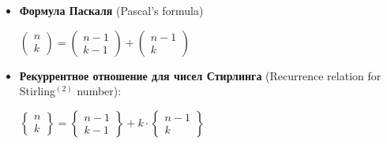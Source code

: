 \documentclass[12pt]{article}
\begin{document}
\begin{itemize}
        $\displaystyle |\Set{\text{разбиение } n \text{ элементов в } k \text{ частей}}| = \begin{Bmatrix}
                                                                                 n \\ k
        \end{Bmatrix} = S^{II}_k (n) = S(n, k)$ - число Стирлинга второго рода

        Для примера выше число Стирлинга $S(4, 2) = \begin{Bmatrix}
                                                        4 \\ 2
        \end{Bmatrix} = 7$

        Согласно Википедии \href{https://ru.wikipedia.org/wiki/%D0%A7%D0%B8%D1%81%D0%BB%D0%B0_%D0%A1%D1%82%D0%B8%D1%80%D0%BB%D0%B8%D0%BD%D0%B3%D0%B0_%D0%B2%D1%82%D0%BE%D1%80%D0%BE%D0%B3%D0%BE_%D1%80%D0%BE%D0%B4%D0%B0}{для формулы Стирлинга}
        есть формула: $\displaystyle S(n, k) = \frac{1}{k!} \sum_{j=0}^k (-1)^{k+j} \begin{pmatrix}
                                                                          k \\ j
        \end{pmatrix}j^n$

        \vspace{5mm}
        \item \textbf{Формула Паскаля} (Pascal's formula)

        $\begin{pmatrix}
             n \\ k
        \end{pmatrix} = \begin{pmatrix}
                            n - 1 \\ k - 1
        \end{pmatrix} + \begin{pmatrix}
                            n - 1 \\ k
        \end{pmatrix}$

        \vspace{5mm}
        \item \textbf{Рекуррентное отношение для чисел Стирлинга} (Recurrence relation for Stirling$\displaystyle ^{(2)}$ number):

        $\begin{Bmatrix}
             n \\ k
        \end{Bmatrix} = \begin{Bmatrix}
                            n - 1 \\ k - 1
        \end{Bmatrix} + k \cdot \begin{Bmatrix}
                                    n - 1 \\ k
        \end{Bmatrix}$


\end{itemize}
\end{document}
